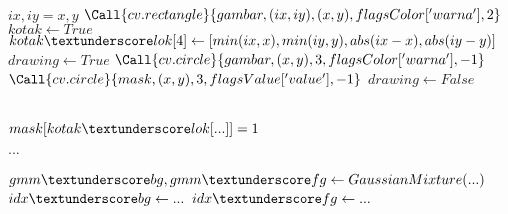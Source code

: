 \begin{algorithm}
\begin{algorithmic}
    \\
            \State $ix, iy = x, y$
            \State $\Call{cv.rectangle}{gambar, (ix, iy), (x, y), flagsColor['warna'], 2}$
            \State $kotak \gets True$
            \State $kotak\textunderscore lok[4] \gets [min(ix, x), min(iy, y), abs(ix-x), abs(iy-y)]$
        \EndIf 
            \State $drawing \gets True$
            \State $\Call{cv.circle}{gambar, (x, y), 3, flagsColor['warna'], -1}$
            \State $\Call{cv.circle}{mask, (x, y), 3, flagsValue['value'], -1}$
            \State $drawing \gets False$
        \EndIf 
    \EndFunction
    \\
\end{algorithmic}
\end{algorithm}

\begin{algorithm}                     
\begin{algorithmic}                    %

    \\
        \State $mask[kotak\textunderscore lok[...]] = 1$ 
    \EndIf

        \State $...$
    \EndFunction
    \\ 
    \\
        \State $gmm\textunderscore bg, gmm\textunderscore fg\gets GaussianMixture(...)$
        \State $idx\textunderscore bg \gets ...$
        \State $idx\textunderscore fg \gets ...$
    \EndFunction

\end{algorithmic}
\end{algorithm}

